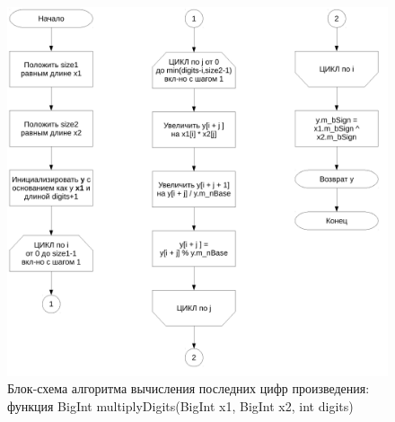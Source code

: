 \documentclass[a4paper,12pt]{article} %
\begin{document}
\begin{figure}[ht]
	\centering
	\includegraphics[width=\textwidth]{lr5_multiplyDigits.pdf}
	\caption{
		Блок-схема алгоритма вычисления последних цифр произведения:
		функция BigInt multiplyDigits(BigInt x1, BigInt x2, int digits)
	}
	\label{bs_lr5_multiplyDigits}
\end{figure}
\end{document}
